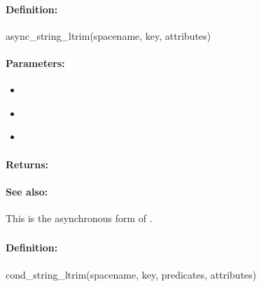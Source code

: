 \paragraph{Definition:}
\begin{rubycode}
async_string_ltrim(spacename, key, attributes)
\end{rubycode}

\paragraph{Parameters:}
\begin{itemize}[noitemsep]
\item {}\\

\item {}\\

\item {}\\

\end{itemize}

\paragraph{Returns:}


\paragraph{See also:}  This is the asynchronous form of .

\pagebreak
\subsubsection{}
\label{api:ruby:cond_string_ltrim}


\paragraph{Definition:}
\begin{rubycode}
cond_string_ltrim(spacename, key, predicates, attributes)
\end{rubycode}

